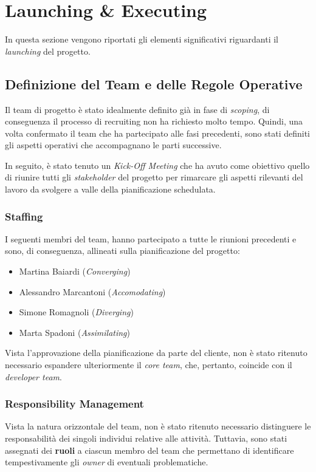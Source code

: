 \section{Launching \& Executing}
\label{sec:launching}

In questa sezione vengono riportati gli elementi significativi riguardanti il \textit{launching} del progetto.

\subsection{Definizione del Team e delle Regole Operative}

Il team di progetto è stato idealmente definito già in fase di \textit{scoping}, di conseguenza il processo di recruiting non ha richiesto molto tempo. Quindi, una volta confermato il team che ha partecipato alle fasi precedenti, sono stati definiti gli aspetti operativi che accompagnano le parti successive.

In seguito, è stato tenuto un \textit{Kick-Off Meeting} che ha avuto come obiettivo quello di riunire tutti gli \textit{stakeholder} del progetto per rimarcare gli aspetti rilevanti del lavoro da svolgere a valle della pianificazione schedulata.

\subsubsection{Staffing}
I seguenti membri del team, hanno partecipato a tutte le riunioni precedenti e sono, di conseguenza, allineati sulla pianificazione del progetto:
\begin{itemize}
    \item Martina Baiardi (\textit{Converging})
    \item Alessandro Marcantoni (\textit{Accomodating})
    \item Simone Romagnoli (\textit{Diverging})
    \item Marta Spadoni (\textit{Assimilating})
\end{itemize}
Vista l'approvazione della pianificazione da parte del cliente, non è stato ritenuto necessario espandere ulteriormente il \textit{core team}, che, pertanto, coincide con il \textit{developer team}.

\subsubsection{Responsibility Management}
Vista la natura orizzontale del team, non è stato ritenuto necessario distinguere le responsabilità dei singoli individui relative alle attività. Tuttavia, sono stati assegnati dei \textbf{ruoli} a ciascun membro del team che permettano di identificare tempestivamente gli \textit{owner} di eventuali problematiche.

